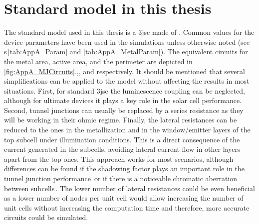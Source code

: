 \section{Standard model in this thesis}
The standard model used in this thesis is a \gls{3jsc} made of \TJ{}. Common values for the device parameters \cite{EspinetGonzalez2012} have been used in the simulations unless otherwise noted (see \tab{}s\,\ref{tab:AppA_Param} and \ref{tab:AppA_MetalParam}). The equivalent circuits for the metal area, active area, and the perimeter are depicted in \fig\,\ref{fig:AppA_MJCircuits}.,, and  respectively. It should be mentioned that several simplifications can be applied to the model without affecting the results in most situations. First, for standard \gls{3jsc} the luminescence coupling can be neglected, although for ultimate devices it plays a key role in the solar cell performance. Second, tunnel junctions can usually be replaced by a series resistance as they will be working in their ohmic regime. Finally, the lateral resistances can be reduced to the ones in the metallization and in the window/emitter layers of the top subcell under illumination conditions. This is a direct consequence of the current generated in the subcells, avoiding lateral current flow in other layers apart from the top ones. This approach works for most scenarios, although differences can be found if the shadowing factor plays an important role in the tunnel junction performance\,\cite{Espinet2011} or if there is a noticeable chromatic aberration between subcells\,\cite{Garcia2011,Garcia2011a}. The lower number of lateral resistances could be even beneficial as a lower number of nodes per unit cell would allow increasing the number of unit cells without increasing the computation time and therefore, more accurate circuits could be simulated.

